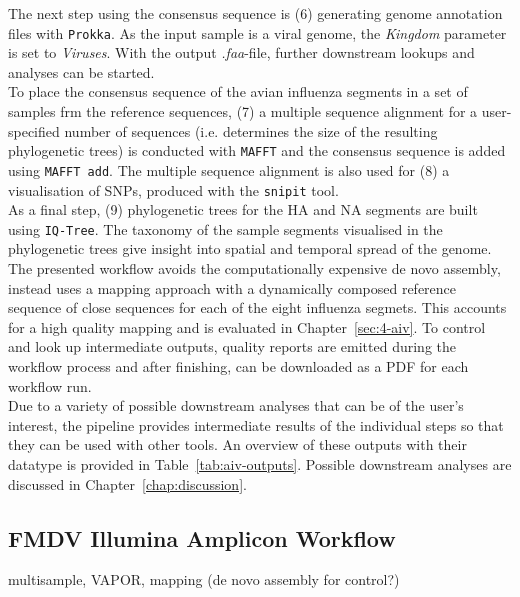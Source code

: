 The next step using the consensus sequence is (6) generating genome annotation files with \texttt{Prokka}. As the input sample is a viral genome, the \textit{Kingdom} parameter is set to \textit{Viruses}. With the output \textit{.faa}-file, further downstream lookups and analyses can be started. \\
To place the consensus sequence of the avian influenza segments in a set of samples frm the reference sequences, (7) a multiple sequence alignment for a user-specified number of sequences (i.e. determines the size of the resulting phylogenetic trees) is conducted with \texttt{MAFFT} and the consensus sequence is added using \texttt{MAFFT add}. The multiple sequence alignment is also used for (8) a visualisation of SNPs, produced with the \texttt{snipit} tool. \\
As a final step, (9) phylogenetic trees for the HA and NA segments are built using \texttt{IQ-Tree}. The taxonomy of the sample segments visualised in the phylogenetic trees give insight into spatial and temporal spread of the genome. \\
The presented workflow avoids the computationally expensive de novo assembly, instead uses a mapping approach with a dynamically composed reference sequence of close sequences for each of the eight influenza segmets. This accounts for a high quality mapping and is evaluated in Chapter~\ref{sec:4-aiv}. To control and look up intermediate outputs, quality reports are emitted during the workflow process and after finishing, can be downloaded as a PDF for each workflow run. \\
Due to a variety of possible downstream analyses that can be of the user's interest, the pipeline provides intermediate results of the individual steps so that they can be used with other tools. An overview of these outputs with their datatype is provided in Table~\ref{tab:aiv-outputs}. Possible downstream analyses are discussed in Chapter~\ref{chap:discussion}.


\subsection{FMDV Illumina Amplicon Workflow}
multisample, VAPOR, mapping (de novo assembly for control?)

